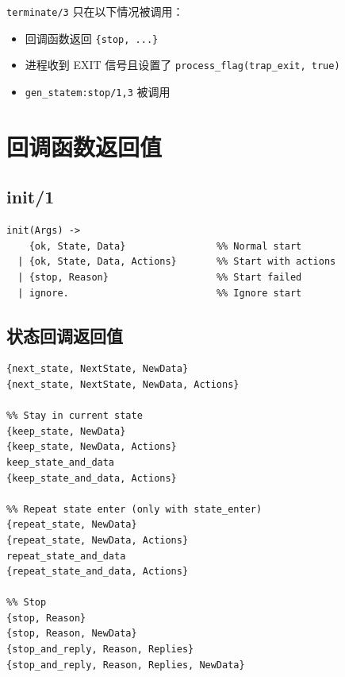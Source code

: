 \documentclass[a4paper,11pt]{article}
\begin{document}
\begin{warnbox}[注意]
\texttt{terminate/3} 只在以下情况被调用：
\begin{itemize}
    \item 回调函数返回 \texttt{\{stop, ...\}}
    \item 进程收到 EXIT 信号且设置了 \texttt{process\_flag(trap\_exit, true)}
    \item \texttt{gen\_statem:stop/1,3} 被调用
\end{itemize}
\end{warnbox}


\section{回调函数返回值}

\subsection{init/1}

\begin{lstlisting}[style=erlangstyle]
init(Args) ->
    {ok, State, Data}                %% Normal start
  | {ok, State, Data, Actions}       %% Start with actions
  | {stop, Reason}                   %% Start failed
  | ignore.                          %% Ignore start
\end{lstlisting}

\subsection{状态回调返回值}

\begin{lstlisting}[style=erlangstyle]
%% State transition
{next_state, NextState, NewData}
{next_state, NextState, NewData, Actions}

%% Stay in current state
{keep_state, NewData}
{keep_state, NewData, Actions}
keep_state_and_data
{keep_state_and_data, Actions}

%% Repeat state enter (only with state_enter)
{repeat_state, NewData}
{repeat_state, NewData, Actions}
repeat_state_and_data
{repeat_state_and_data, Actions}

%% Stop
{stop, Reason}
{stop, Reason, NewData}
{stop_and_reply, Reason, Replies}
{stop_and_reply, Reason, Replies, NewData}
\end{lstlisting}
\end{document}
